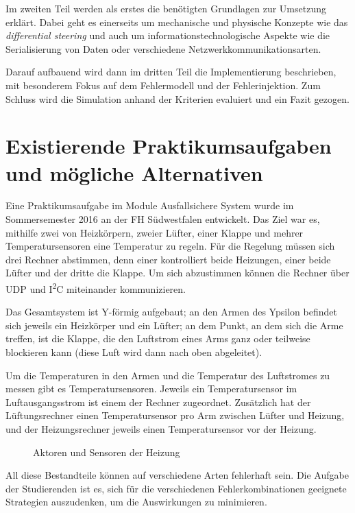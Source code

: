 Im zweiten Teil werden als erstes die ben{\"{o}}tigten Grundlagen zur Umsetzung erkl{\"{a}}rt. Dabei geht es einerseits um 
mechanische und physische Konzepte wie das \textit{differential steering} und auch um informationstechnologische Aspekte
wie die Serialisierung von Daten oder verschiedene Netzwerkkommunikationsarten.

Darauf aufbauend wird dann im dritten Teil die Implementierung beschrieben, mit besonderem Fokus auf dem 
Fehlermodell und der Fehlerinjektion. Zum Schluss wird die Simulation anhand der Kriterien evaluiert und ein Fazit 
gezogen.


\section{Existierende Praktikumsaufgaben und m{\"{o}}gliche Alternativen}\label{heizung}
Eine Praktikumsaufgabe im Module Ausfallsichere System wurde im Sommersemester 2016 an der FH S{\"{u}}dwestfalen entwickelt. Das Ziel war es, mithilfe zwei von Heizk{\"{o}}rpern, zweier
L{\"{u}}fter, einer Klappe und mehrer Temperatursensoren eine Temperatur zu regeln. F{\"{u}}r die Regelung m{\"{u}}ssen sich drei Rechner abstimmen, denn einer kontrolliert
beide Heizungen, einer beide L{\"{u}}fter und der dritte die Klappe. Um sich abzustimmen k{\"{o}}nnen die Rechner {\"{u}}ber UDP und I\textsuperscript{2}C miteinander kommunizieren.

Das Gesamtsystem ist Y-f{\"{o}}rmig aufgebaut; an den Armen des Ypsilon befindet sich jeweils ein Heizk{\"{o}}rper und ein L{\"{u}}fter; an dem Punkt, an dem sich
die Arme treffen, ist die Klappe, die den Luftstrom eines Arms ganz oder teilweise blockieren kann (diese Luft wird dann nach oben abgeleitet).

Um die Temperaturen in den Armen und die Temperatur des Luftstromes zu messen gibt es Temperatursensoren. Jeweils ein Temperatursensor im Luftausgangsstrom ist einem
der Rechner zugeordnet. Zus{\"{a}}tzlich hat der L{\"{u}}ftungsrechner einen Temperatursensor pro Arm zwischen L{\"{u}}fter und Heizung, und der Heizungsrechner jeweils
einen Temperatursensor vor der Heizung.

\begin{figure}
	\centering
	\caption{Aktoren und Sensoren der Heizung}
	\label{fig:heizunghw}
\end{figure}

All diese Bestandteile k{\"{o}}nnen auf verschiedene Arten fehlerhaft sein. Die Aufgabe der Studierenden
ist es, sich f{\"{u}}r die verschiedenen Fehlerkombinationen
geeignete Strategien auszudenken, um die Auswirkungen zu minimieren.

